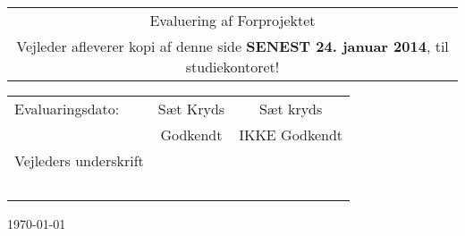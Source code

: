 \begin{center}
\begin{table}[H]
\end{table}

\ \\
\ \\
\ \\
\ \\
\ \\
\ \\
\begin{table}[H]
	\begin{tabular}{|c|}
	\hline
	{\huge Evaluering af Forprojektet}\\
	Vejleder afleverer kopi af denne side \textbf{SENEST 24. januar 2014}, til studiekontoret!
	\end{tabular}
    \begin{tabular}{|p{8.77cm}|c|c|}
    \hline
    Evaluaringsdato: & Sæt Kryds & Sæt kryds\\
    ~ & Godkendt & IKKE Godkendt\\\hline
    Vejleders underskrift & ~ & ~ \\
    ~ & ~ & ~  \\\hline
    \end{tabular}
\end{table}

\vfill %

{\large \today}\\[3cm] %
\end{center}
